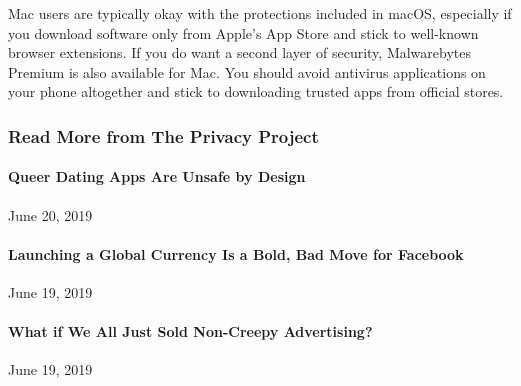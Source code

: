 Mac users are typically okay with the protections included in macOS,
especially if you download software only from Apple's App Store and
stick to well-known browser extensions. If you do want a second layer of
security, Malwarebytes Premium is also available for Mac. You should
avoid antivirus applications on your phone altogether and stick to
downloading trusted apps from official stores.~

\hypertarget{read-more-from-the-privacy-project}{%
\subsubsection{Read More from The Privacy
Project}\label{read-more-from-the-privacy-project}}

\href{https://www.nytimes3xbfgragh.onion/2019/06/20/opinion/queer-dating-apps.html}{}

\hypertarget{queer-dating-apps-are-unsafe-by-design}{%
\paragraph{Queer Dating Apps Are Unsafe by
Design}\label{queer-dating-apps-are-unsafe-by-design}}

June 20, 2019

\href{https://www.nytimes3xbfgragh.onion/2019/06/19/opinion/facebook-currency-libra.html}{}

\hypertarget{launching-a-global-currency-is-a-bold-bad-move-for-facebook}{%
\paragraph{Launching a Global Currency Is a Bold, Bad Move for
Facebook}\label{launching-a-global-currency-is-a-bold-bad-move-for-facebook}}

June 19, 2019

\href{https://www.nytimes3xbfgragh.onion/2019/06/19/opinion/facebook-google-privacy.html}{}

\hypertarget{what-if-we-all-just-sold-non-creepy-advertising}{%
\paragraph{What if We All Just Sold Non-Creepy
Advertising?}\label{what-if-we-all-just-sold-non-creepy-advertising}}

June 19, 2019

\href{https://www.nytimes3xbfgragh.onion/2019/06/18/opinion/facebook-court-privacy.html}{}

